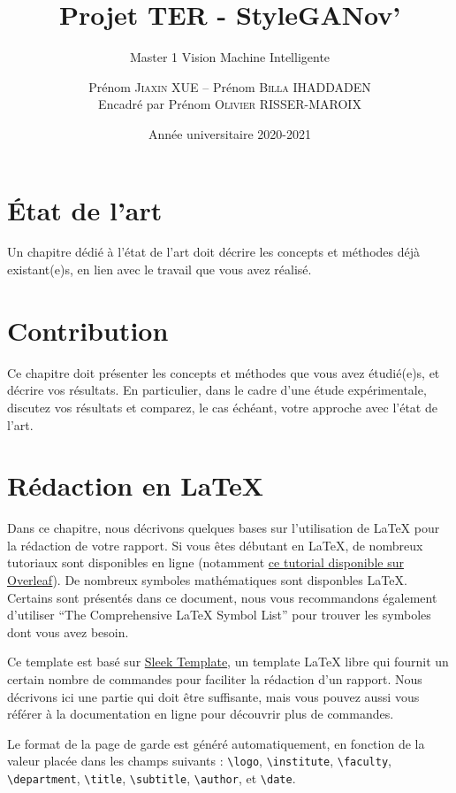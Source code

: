 \documentclass[a4paper, 12pt]{report}
\institute{Université de Paris}
\title{Projet TER - StyleGANov'}
\subtitle{Master 1 Vision Machine Intelligente}
\author{Prénom \textsc{Jiaxin XUE} -- Prénom \textsc{Billa IHADDADEN}\\
{\small Encadré par Prénom \textsc{Olivier RISSER-MAROIX}}}
\date{Année universitaire 2020-2021}
\begin{document}
    \maketitle

    \romantableofcontents

    
    

    \chapter{État de l'art}
    Un chapitre dédié à l'état de l'art doit décrire les concepts et méthodes déjà existant(e)s, en lien avec le travail que vous avez réalisé.
    
    \chapter{Contribution}
    Ce chapitre doit présenter les concepts et méthodes que vous avez étudié(e)s, et décrire vos résultats. En particulier, dans le cadre d'une étude expérimentale, discutez vos résultats et comparez, le cas échéant, votre approche avec l'état de l'art.

    \chapter{Rédaction en \LaTeX}
    Dans ce chapitre, nous décrivons quelques bases sur l'utilisation de \LaTeX{} pour la rédaction de votre rapport.
    Si vous êtes débutant en \LaTeX{}, de nombreux tutoriaux sont disponibles en ligne (notamment \href{https://www.overleaf.com/learn}{ce tutorial disponible sur Overleaf}). De nombreux symboles mathématiques sont disponbles \LaTeX{}. Certains sont présentés dans ce document, nous vous recommandons également d'utiliser \enquote{The Comprehensive \LaTeX{} Symbol List} \cite{pakin2020comprehensive} pour trouver les symboles dont vous avez besoin.
    
    Ce template est basé sur \href{https://fr.overleaf.com/latex/templates/sleek-template/hrksrrdywhfk}{Sleek Template}, un template \LaTeX{} libre qui fournit un certain nombre de commandes pour faciliter la rédaction d'un rapport. Nous décrivons ici une partie qui doit être suffisante, mais vous pouvez aussi vous référer à la documentation en ligne pour découvrir plus de commandes.
    
    
    Le format de la page de garde est généré automatiquement, en fonction de la valeur placée dans les champs suivants : \verb+\logo+, \verb+\institute+, \verb+\faculty+, \verb+\department+, \verb+\title+, \verb+\subtitle+, \verb+\author+, et \verb+\date+.
\end{document}
